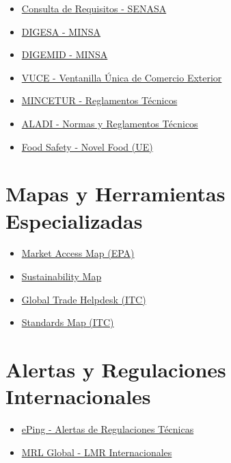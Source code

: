 \documentclass[
  jou,
  floatsintext,
  longtable,
  a4paper,
  nolmodern,
  notxfonts,
  notimes,
  12pt,
  colorlinks=true,linkcolor=blue,citecolor=blue,urlcolor=blue]{apa7}
\providecommand{\tightlist}{%
  \setlength{\itemsep}{0pt}\setlength{\parskip}{0pt}}
\begin{document}
\begin{itemize}
\tightlist
\item
  \href{https://servicios.senasa.gob.pe/consultaRequisitos/consultarRequisitos.action}{Consulta
  de Requisitos - SENASA}
\item
  \href{http://www.digesa.minsa.gob.pe/}{DIGESA - MINSA}
\item
  \href{https://www.digemid.minsa.gob.pe/webDigemid/}{DIGEMID - MINSA}
\item
  \href{https://www.vuce.gob.pe/Paginas/Inicio.aspx}{VUCE - Ventanilla
  Única de Comercio Exterior}
\item
  \href{https://www.mincetur.gob.pe/reglamentostecnicos/}{MINCETUR -
  Reglamentos Técnicos}
\item
  \href{https://www.aladi.org/sitioaladi/normas-y-reglamentos-tecnicos/}{ALADI
  - Normas y Reglamentos Técnicos}
\item
  \href{https://food.ec.europa.eu/food-safety/novel-food_en}{Food Safety
  - Novel Food (UE)}
\end{itemize}

\section{Mapas y Herramientas
Especializadas}\label{mapas-y-herramientas-especializadas}

\begin{itemize}
\tightlist
\item
  \href{https://m.macmap.org/es/learn/epa}{Market Access Map (EPA)}
\item
  \href{https://www.sustainabilitymap.org/home}{Sustainability Map}
\item
  \href{https://globaltradehelpdesk.org/es}{Global Trade Helpdesk (ITC)}
\item
  \href{https://www.standardsmap.org/es/home}{Standards Map (ITC)}
\end{itemize}

\section{Alertas y Regulaciones
Internacionales}\label{alertas-y-regulaciones-internacionales}

\begin{itemize}
\tightlist
\item
  \href{https://epingalert.org/}{ePing - Alertas de Regulaciones
  Técnicas}
\item
  \href{https://www.mrlglobal.com/}{MRL Global - LMR Internacionales}
\end{itemize}
\end{document}
